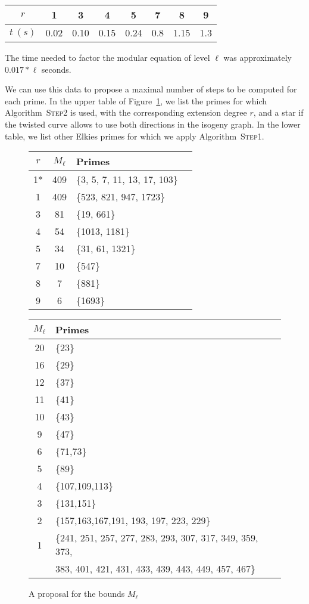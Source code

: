 \documentclass{article}
\newcommand{\algstyle}[1]{\textsc{#1}}
\theoremstyle{definition}
\begin{document}
\begin{center}
\begin{tabular}{c|ccccccc}
$r$ & 1 & 3 & 4 & 5 & 7 & 8 & 9 \\
\hline
$t\ (s)$ & 0.02 & 0.10 & 0.15 & 0.24 & 0.8 & 1.15 & 1.3
\end{tabular}
\end{center}
The time needed to factor the modular equation of level $\ell$
was approximately $0.017 * \ell$ seconds.

We can use this data to propose a maximal number of steps to be
computed for each prime. In the upper table of Figure~\ref{fig:steps}, we
list the primes for which Algorithm~\algstyle{Step2} is used, with
the corresponding extension degree $r$, and a star if the twisted curve
allows to use both directions in the isogeny graph. In the lower table,
we list other Elkies primes for which we apply Algorithm~\algstyle{Step1}.

\begin{figure}
\centering
\begin{tabular}{cclc}
$r$ & $M_\ell$ & Primes \\
\hline
1* & 409 & \{3, 5, 7, 11, 13, 17, 103\} \\
1 & 409 & \{523, 821, 947, 1723\} \\
3 & 81 & \{19, 661\} \\
4 & 54 & \{1013, 1181\} \\
5 & 34 & \{31, 61, 1321\} \\
7 & 10 & \{547\} \\
8 & 7 & \{881\} \\
9 & 6 & \{1693\}
\end{tabular}
\vfill
\begin{tabular}{cl}
$M_\ell$ & Primes \\
\hline
20 & \{23\} \\
16 & \{29\} \\
12 & \{37\} \\
11 & \{41\} \\
10 & \{43\} \\
9 & \{47\} \\
6 & \{71,73\} \\
5 & \{89\} \\
4 & \{107,109,113\} \\
3 & \{131,151\} \\
2 & \{157,163,167,191,
  193,
  197,
  223,
  229\} \\
1 & \{241,
  251,
  257,
  277,
  283,
  293,
  307,
  317,
  349,
  359,
  373,
	\\ &
  383,
  401,
  421,
  431,
  433,
  439,
  443,
  449,
  457,
  467\} \\
\end{tabular}
\caption{\label{fig:steps} A proposal for the bounds $M_\ell$}
\end{figure}
\end{document}
